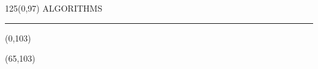 \begin{textblock}{125}(0,97)
\sffamily\normalsize{\color{sciorange}ALGORITHMS}\small\\
\rule[3mm]{125mm}{0.1pt}
\end{textblock} 

\begin{textblock}{60}(0,103)
    
    
\end{textblock}

\begin{textblock}{60}(65,103)
    
\end{textblock}